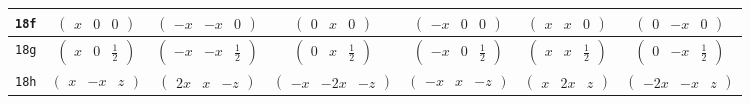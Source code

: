 \documentclass[fleqn,9pt,landscape]{jsarticle}
\begin{document}
\begin{center}
\begin{longtable}{ccccccc}
{\tt 18f} & $ \begin{pmatrix} x & 0 & 0 \end{pmatrix} $ & $ \begin{pmatrix} - x & - x & 0 \end{pmatrix} $ & $ \begin{pmatrix} 0 & x & 0 \end{pmatrix} $ & $ \begin{pmatrix} - x & 0 & 0 \end{pmatrix} $ & $ \begin{pmatrix} x & x & 0 \end{pmatrix} $ & $ \begin{pmatrix} 0 & - x & 0 \end{pmatrix} $ \\ \hline
{\tt 18g} & $ \begin{pmatrix} x & 0 & \frac{1}{2} \end{pmatrix} $ & $ \begin{pmatrix} - x & - x & \frac{1}{2} \end{pmatrix} $ & $ \begin{pmatrix} 0 & x & \frac{1}{2} \end{pmatrix} $ & $ \begin{pmatrix} - x & 0 & \frac{1}{2} \end{pmatrix} $ & $ \begin{pmatrix} x & x & \frac{1}{2} \end{pmatrix} $ & $ \begin{pmatrix} 0 & - x & \frac{1}{2} \end{pmatrix} $ \\ \hline
{\tt 18h} & $ \begin{pmatrix} x & - x & z \end{pmatrix} $ & $ \begin{pmatrix} 2 x & x & - z \end{pmatrix} $ & $ \begin{pmatrix} - x & - 2 x & - z \end{pmatrix} $ & $ \begin{pmatrix} - x & x & - z \end{pmatrix} $ & $ \begin{pmatrix} x & 2 x & z \end{pmatrix} $ & $ \begin{pmatrix} - 2 x & - x & z \end{pmatrix} $ \\ \hline

\end{longtable}
\end{center}
\end{document}
